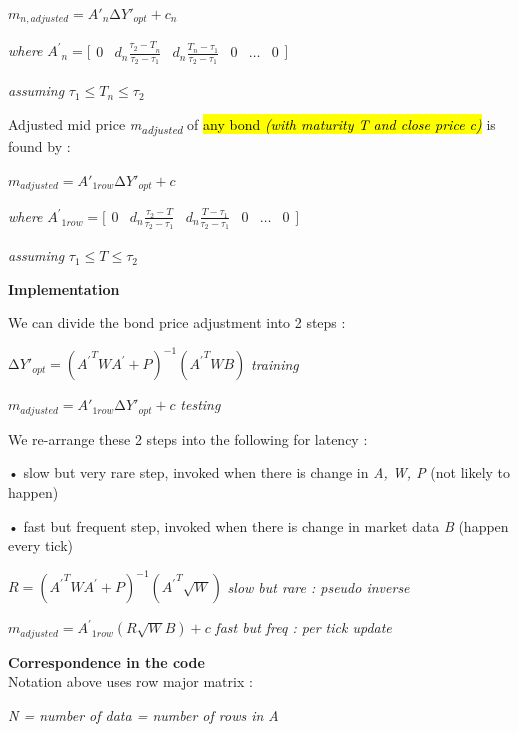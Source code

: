 \(m_{n,adjusted} = {A'}_{n}{\mathrm{\Delta}Y'}_{opt} + c_{n}\)

\emph{where} \({A^{'}}_{n} = \lbrack\begin{matrix}
0 & d_{n}\frac{{\tau_{2} - T}_{n}}{\tau_{2} - \tau_{1}} & d_{n}\frac{T_{n} - \tau_{1}}{\tau_{2} - \tau_{1}} & 0 & \ldots & 0
\end{matrix}\rbrack\)

\emph{assuming} \(\tau_{1} \leq T_{n} \leq \tau_{2}\)

Adjusted mid price \emph{m\textsubscript{adjusted}} of \hl{any bond
\emph{(with maturity T and close price c)}} is found by :

\(m_{adjusted} = {A'}_{1row}{\mathrm{\Delta}Y'}_{opt} + c\)

\emph{where} \({A^{'}}_{1row} = \lbrack\begin{matrix}
0 & d_{n}\frac{\tau_{2} - T}{\tau_{2} - \tau_{1}} & d_{n}\frac{T - \tau_{1}}{\tau_{2} - \tau_{1}} & 0 & \ldots & 0
\end{matrix}\rbrack\)

\emph{assuming} \(\tau_{1} \leq T \leq \tau_{2}\)

\textbf{Implementation}

We can divide the bond price adjustment into 2 steps :

\({\mathrm{\Delta}Y'}_{opt} = \left( {A^{'}}^{T}WA^{'} + P \right)^{- 1}\left( {A^{'}}^{T}WB \right)\)
\emph{training}

\(m_{adjusted} = {A'}_{1row}{\mathrm{\Delta}Y'}_{opt} + c\)
\emph{testing}

We re-arrange these 2 steps into the following for latency :

• slow but very rare step, invoked when there is change in \emph{A, W,
P} (not likely to happen)

• fast but frequent step, invoked when there is change in market data
\emph{B} (happen every tick)

\(R = \left( {A^{'}}^{T}WA^{'} + P \right)^{- 1}\left( {A^{'}}^{T}\sqrt{W} \right)\)
\emph{slow but rare : pseudo inverse}

\(m_{adjusted} = {A^{'}}_{1row}(R\sqrt{W}B) + c\) \emph{fast but freq :
per tick update}

\textbf{\hfill\break
}

\textbf{Correspondence in the code\\
}Notation above uses row major matrix :

\emph{N = number of data = number of rows in A}

